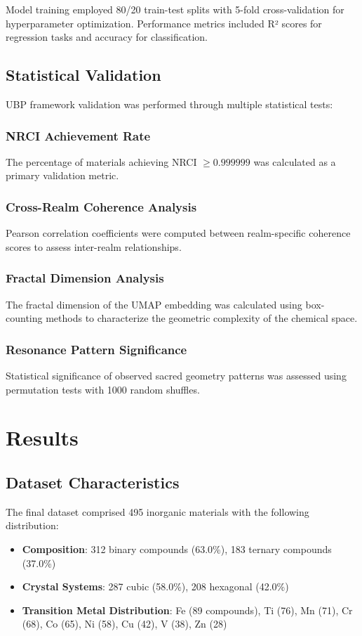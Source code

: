 \documentclass[12pt,a4paper]{article}
\begin{document}
Model training employed 80/20 train-test splits with 5-fold cross-validation for hyperparameter optimization. Performance metrics included R² scores for regression tasks and accuracy for classification.

\subsection{Statistical Validation}

UBP framework validation was performed through multiple statistical tests:

\subsubsection{NRCI Achievement Rate}
The percentage of materials achieving NRCI $\geq 0.999999$ was calculated as a primary validation metric.

\subsubsection{Cross-Realm Coherence Analysis}
Pearson correlation coefficients were computed between realm-specific coherence scores to assess inter-realm relationships.

\subsubsection{Fractal Dimension Analysis}
The fractal dimension of the UMAP embedding was calculated using box-counting methods to characterize the geometric complexity of the chemical space.

\subsubsection{Resonance Pattern Significance}
Statistical significance of observed sacred geometry patterns was assessed using permutation tests with 1000 random shuffles.

\section{Results}

\subsection{Dataset Characteristics}

The final dataset comprised 495 inorganic materials with the following distribution:
\begin{itemize}
    \item \textbf{Composition}: 312 binary compounds (63.0\%), 183 ternary compounds (37.0\%)
    \item \textbf{Crystal Systems}: 287 cubic (58.0\%), 208 hexagonal (42.0\%)
    \item \textbf{Transition Metal Distribution}: Fe (89 compounds), Ti (76), Mn (71), Cr (68), Co (65), Ni (58), Cu (42), V (38), Zn (28)
\end{itemize}
\end{document}
